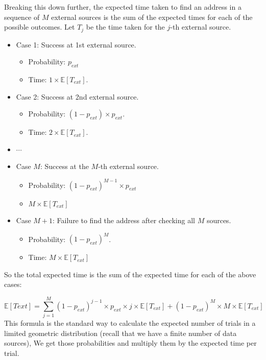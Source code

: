 \documentclass{article}
\begin{document}
Breaking this down further, the expected time taken to find an address in a sequence of $M$ external sources is the sum of the expected times for each of the possible outcomes. Let $T_{j}$ be the time taken for the $j$-th external source.

\begin{itemize}
    \item Case 1: Success at 1st external source.
    \begin{itemize}
        \item Probability: $p_{ext}$
        \item Time: $1 \times \mathbb{E}\left[T_{ext}\right]$.
    \end{itemize}
    \item Case 2: Success at 2nd external source.
    \begin{itemize}
        \item Probability: $\left(1 - p_{ext}\right) \times p_{ext}$.
        \item Time: $2 \times \mathbb{E}\left[T_{ext}\right]$.
    \end{itemize}
    \item $\cdots$
    \item Case $M$: Success at the $M$-th external source.
    \begin{itemize}
        \item Probability: $\left(1 - p_{ext}\right)^{M-1} \times p_{ext}$
        \item $M \times \mathbb{E}\left[T_{ext}\right]$
    \end{itemize}
    \item Case $M+1$: Failure to find the address after checking all $M$ sources.
    \begin{itemize}
        \item Probability: $\left(1 - p_{ext}\right)^{M}$.
        \item Time: $M \times \mathbb{E}\left[ T_{ext} \right]$
    \end{itemize}
\end{itemize}
So the total expected time is the sum of the expected time for each of the above cases:

\begin{equation}
    \mathbb{E}\left[Text \right] = \sum_{j=1}^M \left(1 - p_{ext}\right)^{j-1} \times p_{ext} \times j \times \mathbb{E}\left[ T_{ext} \right] + \left(1 - p_{ext} \right)^{M} \times M \times \mathbb{E}\left[ T_{ext}\right] 
\end{equation}
This formula is the standard way to calculate the expected number of trials in a limited geometric distribution (recall that we have a finite number of data sources), We get those probabilities and multiply them by the expected time per trial.
\end{document}

